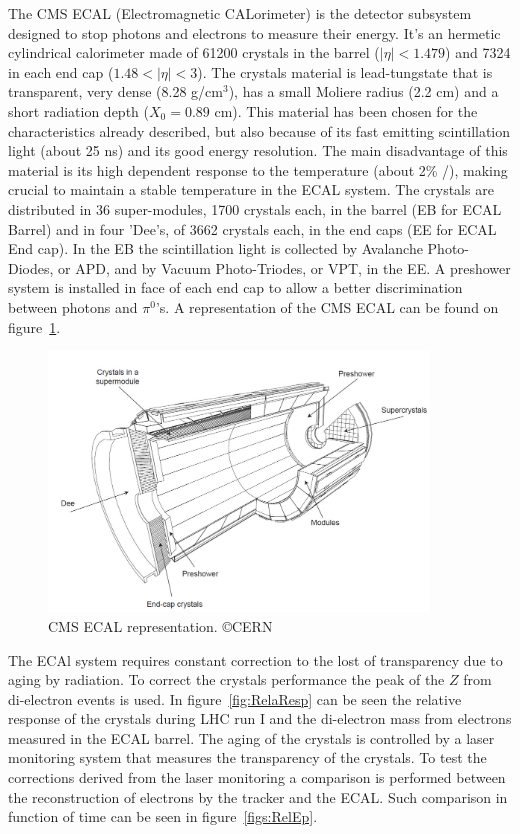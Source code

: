 The CMS ECAL (Electromagnetic CALorimeter) is the detector subsystem designed to stop photons and electrons to measure their energy. It's an hermetic cylindrical calorimeter made of 61200 crystals in the barrel ($|\eta|<1.479$) and 7324 in each end cap ($1.48<|\eta|<3$). The crystals material is lead-tungstate that is transparent, very dense (8.28 g/$\text{cm}^{3}$), has a small Moliere radius (2.2 cm) and a short radiation depth ($X_{0}=0.89$ cm). This material has been chosen for the characteristics already described, but also because of its fast emitting scintillation light (about 25 ns) and its good energy resolution. The main disadvantage of this material is its high dependent response to the temperature (about 2\% /\celsius), making crucial to maintain a stable temperature in the ECAL system. The crystals are distributed in 36 super-modules, 1700 crystals each, in the barrel (EB for ECAL Barrel) and in four 'Dee's, of 3662 crystals each, in the end caps (EE for ECAL End cap). In the EB the scintillation light is collected by Avalanche Photo-Diodes, or APD, and by Vacuum Photo-Triodes, or VPT, in the EE. A preshower system is installed in face of each end cap to allow a better discrimination between photons and $\pi^{0}$'s. A representation of the CMS ECAL can be found on figure~\ref{fig:ecal}.

\begin{figure}[!Hhtbp]
  \begin{center}
    \includegraphics[width=0.9\textwidth]{figs/ECAL.png}
    \caption{CMS ECAL representation. \copyright CERN}
    \label{fig:ecal}
  \end{center}
\end{figure}

The ECAl system requires constant correction to the lost of transparency due to aging by radiation. To correct the crystals performance the peak of the $Z$ from di-electron events is used. In figure~\ref{fig:RelaResp} can be seen the relative response of the crystals during LHC run I and the di-electron mass from electrons measured in the ECAL barrel. The aging of the crystals is controlled by a laser monitoring system that measures the transparency of the crystals. To test the corrections derived from the laser monitoring a comparison is performed between the reconstruction of electrons by the tracker and the ECAL. Such comparison in function of time can be seen in figure~\ref{figs:RelEp}.

